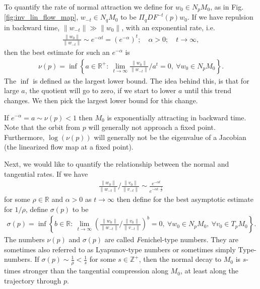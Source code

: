 To quantify the rate of normal attraction we define for $w_0 \in N_{p}M_0$, as in Fig. \ref{fig:inv_lin_flow_map}, $w_{-t}\in N_{q}M_0$ to be $\Pi_{q}DF^{-t}(p)w_0 $. If we have repulsion in backward time, $\| w_{-t}\| \gg \| w_0\|$, with an exponential rate, i.e. 
\begin{align}
	\frac{\|w_0 \|}{\| w_{-t}\|}\sim e^{-\alpha t}	= (e^{-\alpha })^{t}; \quad \alpha >0; \quad t \to \infty ,
\end{align}
then the best estimate for such an $e^{-\alpha }$ is 
\begin{align}
	\boxed{
		\nu(p) = \inf \left\{ a \in \mathbb{R}^{+}:\ \lim_{t\to\infty }{\frac{\|w_0\|}{\|w_{-t}\|}}/{a^{t}} = 0,\ \forall w_0 \in N_{p}M_0 \right\}.
	}
\end{align}
The $\inf $ is defined as the largest lower bound. The idea behind this, is that for large $a$, the quotient will go to zero, if we start to lower $a$ until this trend changes. We then pick the largest lower bound for this change.

If $e^{-\alpha }=a \sim \nu(p) < 1$ then $M_0$ is exponentially attracting in backward time. Note that the orbit from $p$ will generally not approach a fixed point. Furthermore, $\log(\nu(p))$ will generally not be the eigenvalue of a Jacobian (the linearized flow map at a fixed point).

Next, we would like to quantify the relationship between the normal and tangential rates. If we have
\begin{align}
{\frac{\| w_0 \|}{\|w_{-t}\|}}/{\frac{\|v_0\|}{\|v_{-t}\|}} \sim \frac{e^{-\alpha t}}{e^{-\alpha t \cdot \frac{1}{\rho}}}
\end{align}
for some $\rho \in \mathbb{R}$ and $\alpha >0$ as $t\to \infty $ then define for the best asymptotic estimate for $1/\rho$, define $\sigma(p)$ to be
\begin{align}
	\boxed{
		\sigma(p) = \inf \left\{ b \in \mathbb{R}:\ \lim_{t\to \infty }\left({\frac{\|w_0\|}{\|w_{-t}\|}}/{\frac{\|v_0\|}{\|v_{-t}\|}}\right)^{b} = 0,\ \forall w_0 \in N_{p}M_0,\ \forall v_0 \in T_{p}M_0 \right\}.
	}
\end{align}
The numbers $\nu(p)$ and $\sigma(p)$ are called {\emph Fenichel-type numbers}. They are sometimes also referred to as Lyapunov-type numbers or sometimes simply Type-numbers. If $\sigma(p) \sim \frac{1}{\rho} < \frac{1}{s}$ for some $s\in \mathbb{Z}^{+}$, then the normal decay to $M_0$ is $s$-times stronger than the tangential compression along $M_0$, at least along the trajectory through $p$.

